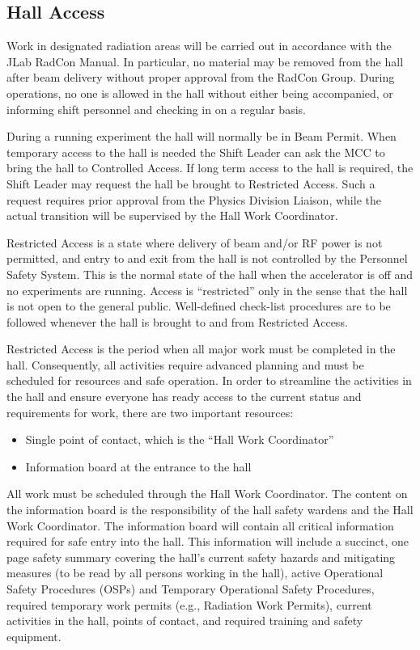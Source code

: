\documentclass[10pt]{article}
\begin{document}
\subsection{Hall Access}

Work in designated radiation
areas will be carried out in accordance
with the JLab RadCon Manual. In particular, no material
may be removed from the hall after beam delivery
without proper approval from
the RadCon Group.
During operations, no one is allowed in the hall
without either being accompanied, or informing shift personnel
and checking in on a regular basis.

During a running experiment the hall will normally be in Beam Permit. When
temporary access to the hall is needed the Shift Leader can ask the MCC to
bring the hall to Controlled Access. If long term access to the hall is
required, the Shift Leader may request the hall be brought to Restricted
Access. Such a request requires prior approval from the Physics Division
Liaison, while the actual transition will be supervised by the Hall Work
Coordinator.

Restricted Access is a state where  delivery of beam and/or RF power is not
permitted, and entry to and exit
from the hall is not controlled by the Personnel Safety System. This is the
normal state of the hall when the accelerator is off and no experiments are
running. Access is ``restricted'' only in the sense that the hall is not open
to the general public. Well-defined check-list procedures are to
be followed whenever the hall is brought to and from Restricted Access.

Restricted Access is the period when all major work must be completed in the
hall. Consequently, all activities require advanced planning and must be
scheduled for resources and safe operation. In order to streamline the
activities in the hall and ensure everyone
has ready access to the current status and requirements for work, there
are two important resources:
\begin{itemize}
\item Single point of contact, which is the ``Hall Work Coordinator''
\item Information board at the entrance to the hall
\end{itemize}
All work must be scheduled through the Hall Work Coordinator. The content
on the information board is the responsibility of the hall safety wardens
and the Hall Work Coordinator. The information board will contain all critical
information required for safe entry into the hall. This information will
include a succinct, one page safety summary covering the hall's current
safety hazards and mitigating measures (to be read by all persons working
in the hall), active Operational Safety Procedures (OSPs) and Temporary
Operational Safety Procedures, required temporary work permits
(e.g., Radiation Work Permits), current activities in the hall, points of
contact, and required training and safety equipment.
\end{document}
